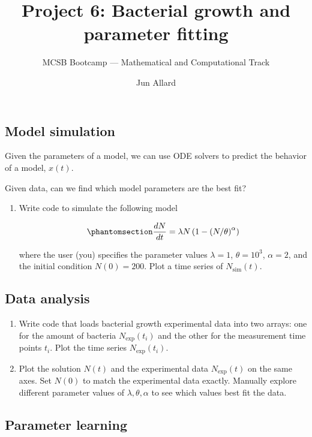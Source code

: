 \documentclass[
  letterpaper,
  DIV=11,
  numbers=noendperiod]{scrartcl}
\title{Project 6: Bacterial growth and parameter fitting}
\subtitle{MCSB Bootcamp --- Mathematical and Computational Track}
\author{Jun Allard}
\date{}
\providecommand{\tightlist}{%
  \setlength{\itemsep}{0pt}\setlength{\parskip}{0pt}}
\begin{document}
\maketitle


\subsection{Model simulation}\label{model-simulation}

Given the parameters of a model, we can use ODE solvers to predict the
behavior of a model, \(x(t)\).

Given data, can we find which model parameters are the best fit?

\begin{enumerate}
\def\labelenumi{\alph{enumi}.}
\item
  Write code to simulate the following model

  \begin{equation}\protect\phantomsection\label{eq-generalized-logistic}{\frac{dN}{dt} = \lambda N \left( 1 - \left(N/\theta\right)^\alpha\right)}\end{equation}

  where the user (you) specifies the parameter values \(\lambda=1\),
  \(\theta=10^3\), \(\alpha=2\), and the initial condition \(N(0)=200\).
  Plot a time series of \(N_\mathrm{sim}(t)\).
\end{enumerate}

\subsection{Data analysis}\label{data-analysis}

\begin{enumerate}
\def\labelenumi{\alph{enumi}.}
\setcounter{enumi}{1}
\tightlist
\item
  Write code that loads bacterial growth experimental data into two
  arrays: one for the amount of bacteria \(N_\mathrm{exp}(t_i)\) and the
  other for the measurement time points \(t_i\). Plot the time series
  \(N_\mathrm{exp}(t_i)\).
\item
  Plot the solution \(N(t)\) and the experimental data
  \(N_\mathrm{exp}(t)\) on the same axes. Set \(N(0)\) to match the
  experimental data exactly. Manually explore different parameter values
  of \(\lambda,\theta,\alpha\) to see which values best fit the data.
\end{enumerate}

\subsection{Parameter learning}\label{parameter-learning}
\end{document}
